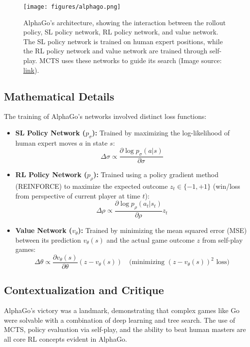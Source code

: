 \documentclass[11pt,a4paper]{article}
\begin{document}
\begin{figure}[t]
    \centering
    \texttt{[image: figures/alphago.png]}
    \caption{AlphaGo's architecture, showing the interaction between the rollout policy, SL policy network, RL policy network, and value network. The SL policy network is trained on human expert positions, while the RL policy network and value network are trained through self-play. MCTS uses these networks to guide its search (Image source: \href{https://jonathan-hui.medium.com/alphago-how-it-works-technically-26ddcc085319}{link}).}
    \label{fig:alphago_architecture}
\end{figure}

\subsection{Mathematical Details}
The training of AlphaGo's networks involved distinct loss functions:
\begin{itemize}
    \item \textbf{SL Policy Network ($p_{\sigma}$):} Trained by maximizing the log-likelihood of human expert moves $a$ in state $s$:
    \[ \Delta\sigma \propto \frac{\partial \log p_{\sigma}(a|s)}{\partial \sigma} \]
    \item \textbf{RL Policy Network ($p_{\rho}$):} Trained using a policy gradient method (REINFORCE) to maximize the expected outcome $z_t \in \{-1, +1\}$ (win/loss from perspective of current player at time $t$):
    \[ \Delta\rho \propto \frac{\partial \log p_{\rho}(a_t|s_t)}{\partial \rho} z_t \]
    \item \textbf{Value Network ($v_{\theta}$):} Trained by minimizing the mean squared error (MSE) between its prediction $v_{\theta}(s)$ and the actual game outcome $z$ from self-play games:
    \[ \Delta\theta \propto \frac{\partial v_{\theta}(s)}{\partial \theta} (z - v_{\theta}(s)) \quad \text{(minimizing } (z - v_{\theta}(s))^2 \text{ loss)} \]
\end{itemize}

\subsection{Contextualization and Critique}
AlphaGo's victory was a landmark, demonstrating that complex games like Go were solvable with a combination of deep learning and tree search. The use of MCTS, policy evaluation via self-play, and the ability to beat human masters are all core RL concepts evident in AlphaGo.
\end{document}
